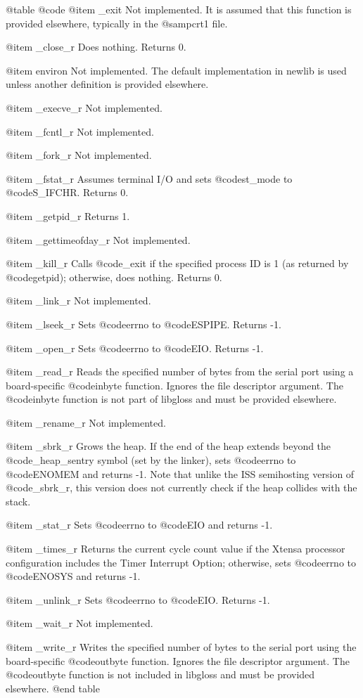 @table @code
@item _exit
Not implemented.  It is assumed that this function is provided
elsewhere, typically in the @samp{crt1} file.

@item _close_r
Does nothing.  Returns 0.

@item environ
Not implemented.  The default implementation in newlib is used unless
another definition is provided elsewhere.

@item _execve_r
Not implemented.

@item _fcntl_r
Not implemented.

@item _fork_r
Not implemented.

@item _fstat_r
Assumes terminal I/O and sets @code{st_mode} to @code{S_IFCHR}.
Returns 0.

@item _getpid_r
Returns 1.

@item _gettimeofday_r
Not implemented.

@item _kill_r
Calls @code{_exit} if the specified process ID is 1 (as returned by
@code{getpid}); otherwise, does nothing.  Returns 0.

@item _link_r
Not implemented.

@item _lseek_r
Sets @code{errno} to @code{ESPIPE}.  Returns -1.

@item _open_r
Sets @code{errno} to @code{EIO}.  Returns -1.

@item _read_r
Reads the specified number of bytes from the serial port using a
board-specific @code{inbyte} function.  Ignores the file descriptor
argument.  The @code{inbyte} function is not part of libgloss and must
be provided elsewhere.

@item _rename_r
Not implemented.

@item _sbrk_r
Grows the heap.  If the end of the heap extends beyond the
@code{_heap_sentry} symbol (set by the linker), sets @code{errno} to
@code{ENOMEM} and returns -1.  Note that unlike the ISS semihosting
version of @code{_sbrk_r}, this version does not currently check if the
heap collides with the stack.

@item _stat_r
Sets @code{errno} to @code{EIO} and returns -1.

@item _times_r
Returns the current cycle count value if the Xtensa processor
configuration includes the Timer Interrupt Option; otherwise, sets
@code{errno} to @code{ENOSYS} and returns -1.

@item _unlink_r
Sets @code{errno} to @code{EIO}.  Returns -1.

@item _wait_r
Not implemented.

@item _write_r
Writes the specified number of bytes to the serial port using
the board-specific @code{outbyte} function.  Ignores the file descriptor
argument.  The @code{outbyte} function is not included in libgloss and
must be provided elsewhere.
@end table


